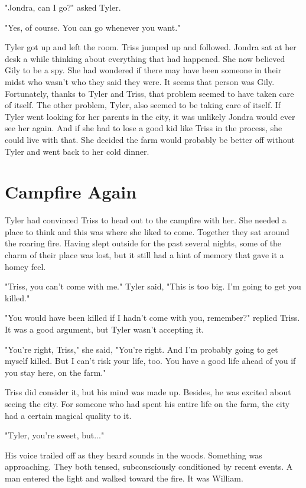 \documentclass[courier]{sffms}
\begin{document}
"Jondra, can I go?" asked Tyler.

"Yes, of course. You can go whenever you want."

Tyler got up and left the room. Triss jumped up
and followed. Jondra sat at her desk a while
thinking about everything that had happened.
She now believed Gily to be a spy. She had
wondered if there may have been someone
in their midst who wasn't who they said they
were. It seems that person was Gily. Fortunately,
thanks to Tyler and Triss, that problem seemed
to have taken care of itself. The other problem,
Tyler, also seemed to be taking care of itself.
If Tyler went looking for her parents in the city,
it was unlikely Jondra would ever see her again.
And if she had to lose a good kid like Triss in the
process, she could live with that. She decided
the farm would probably be better off without
Tyler and went back to her cold dinner.

\chapter{Campfire Again}
Tyler had convinced Triss to head out to the
campfire with her. She needed a place to think
and this was where she liked to come. Together
they sat around the roaring fire. Having slept
outside for the past several nights, some of the
charm of their place was lost, but it still had a
hint of memory that gave it a homey feel.

"Triss, you can't come with me." Tyler said,
"This is too big. I'm going to get you killed."

"You would have been killed if I hadn't come
with you, remember?" replied Triss. It was a
good argument, but Tyler wasn't accepting it.

"You're right, Triss," she said, "You're right.
And I'm probably going to get myself killed. But
I can't risk your life, too. You have a good life
ahead of you if you stay here, on the farm."

Triss did consider it, but his mind was made up.
Besides, he was excited about seeing the city.
For someone who had spent his entire life on the
farm, the city had a certain magical quality to it.

"Tyler, you're sweet, but..."

His voice trailed off as they heard sounds in the
woods. Something was approaching. They both
tensed, subconsciously conditioned by recent
events. A man entered the light and walked
toward the fire. It was William.
\end{document}
